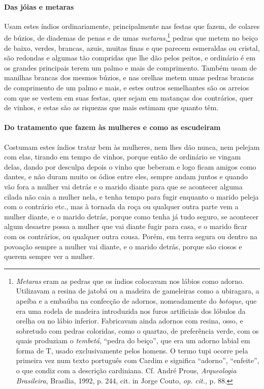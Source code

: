 \begin{linenumbers}
\paragraph{Das jóias e metaras} \quad
Usam estes índios ordinariamente, principalmente nas festas
que fazem, de colares de búzios, de diademas de penas e de umas
\textit{metaras},\footnote{ \textit{Metaras} eram as pedras que os
índios colocavam nos lábios como adorno. Utilizavam a resina de
jatobá ou a madeira de gameleiras como a ubiragara, a apeíba e a
embaúba na confecção de adornos, nomeadamente do \textit{botoque}, que
era uma rodela de madeira introduzida nos furos artificiais dos lóbulos
da orelha ou no lábio inferior. Fabricavam ainda adornos com resina,
osso, e sobretudo com pedras coloridas, como o quartzo, de preferência
verde, com os quais produziam o \textit{tembetá}, ``pedra do beiço'', que
era um adorno labial em forma de T, usado exclusivamente pelos
homens. O termo tupi ocorre pela primeira vez num texto
português com Cardim e significa ``adorno'', ``enfeite'', o que condiz com
a descrição cardiniana. Cf. André Prous, \textit{Arqueologia
Brasileira}, Brasília, 1992, p. 244, cit. in Jorge Couto, \textit{op. cit.}, 
p. 88.} pedras que metem no beiço de baixo, verdes, brancas,
azuis, muitas finas e que parecem esmeraldas ou cristal, são redondas e
algumas tão compridas que lhe dão pelos peitos, e ordinário é em os
grandes principais terem um palmo e mais de comprimento. Também usam de
manilhas brancas dos mesmos búzios, e nas orelhas metem umas pedras
brancas de comprimento de um palmo e mais, e estes outros semelhantes
são os arreios com que se vestem em suas festas, quer sejam em matanças
dos contrários, quer de vinhos, e estas são as riquezas que mais
estimam que quanto têm.

\paragraph{Do tratamento que fazem às mulheres e como as \mbox{escudeiram}} \quad
Costumam estes índios tratar bem às mulheres, nem lhes dão
nunca, nem pelejam com elas, tirando em tempo de vinhos, porque então
de ordinário se vingam delas, dando por desculpa depois o vinho que
beberam e logo ficam amigos como dantes, e não duram muito os ódios
entre eles, sempre andam juntos e quando vão fora a mulher vai detrás
e o marido diante para que se acontecer alguma cilada não caia a mulher
nela, e tenha tempo para fugir enquanto o marido peleja com o
contrário etc., mas à tornada da roça ou qualquer outra parte vem a
mulher diante, e o marido detrás, porque como tenha já tudo seguro, se
acontecer algum desastre possa a mulher que vai diante fugir para casa,
e o marido ficar com os contrários, ou qualquer outra cousa. Porém, em
terra segura ou dentro na povoação sempre a mulher vai diante, e o
marido detrás, porque são ciosos e querem sempre ver a mulher.


\end{linenumbers}
